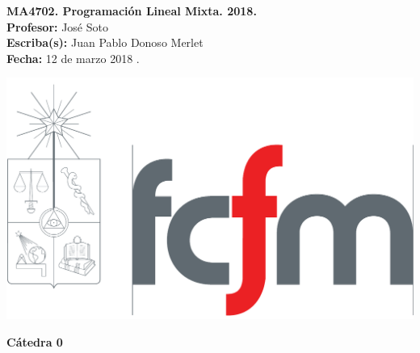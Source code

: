 \documentclass[10pt]{article}
\theoremstyle{plain}
\theoremstyle{definition}
\newcommand{\sca}{Juan Pablo Donoso Merlet}
\newcommand{\catnum}{0} %
\newcommand{\fecha}{12 de marzo 2018 }
\begin{document}
\vspace*{-1.2 cm}
\begin{minipage}{0.6\textwidth}
\begin{flushleft}
\hspace*{-0.5cm}\textbf{MA4702. Programación Lineal Mixta. 2018.}\\
\hspace*{-0.5cm}\textbf{Profesor:} José Soto\\
\hspace*{-0.5cm}\textbf{Escriba(s):} \sca\\
\hspace*{-0.5cm}\textbf{Fecha:} \fecha.
\end{flushleft}
\end{minipage}
\begin{minipage}{0.36\textwidth}
\begin{flushright}
\includegraphics[scale=0.15]{fcfm}
\end{flushright}
\end{minipage}
\bigskip

\begin{center}
\LARGE\textbf{Cátedra \catnum}
\end{center}
\end{document}
